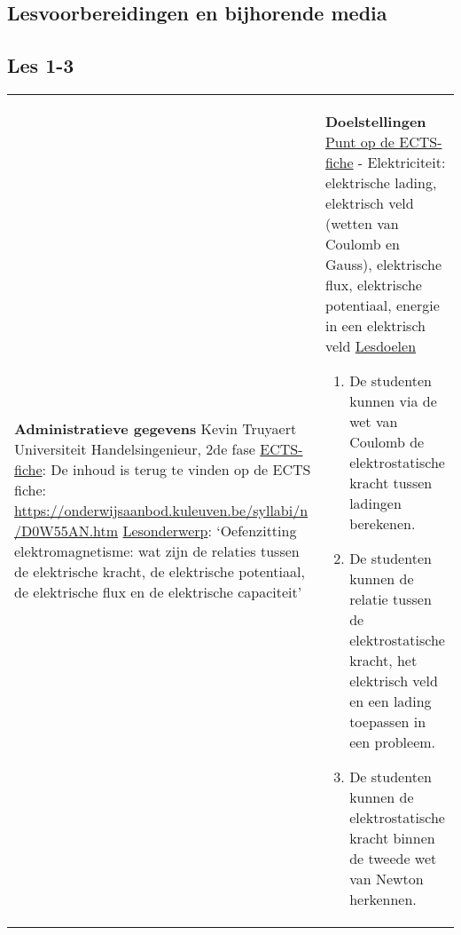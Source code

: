 


\begin{landscape}
	\section{Lesvoorbereidingen en bijhorende media}
	
	\subsection{Les 1-3}
	\begin{tabularx}{1.56\textwidth}{|p{}|X|}\hline
		\textbf{Administratieve gegevens}\newline\newline
		Kevin Truyaert\newline\newline
		Universiteit\newline
		Handelsingenieur, 2de fase\newline
		\underline{ECTS-fiche}: De inhoud is terug te vinden op de ECTS fiche: \href{https://onderwijsaanbod.kuleuven.be/syllabi/n/D0W55AN.htm}{https://onderwijsaanbod.kuleuven.be/syllabi/n /D0W55AN.htm} \newline
		\underline{Lesonderwerp}: `Oefenzitting elektromagnetisme: wat zijn de relaties tussen de elektrische kracht, de  elektrische potentiaal, de elektrische flux en de elektrische capaciteit' & \textbf{Doelstellingen}\newline\vspace{0.5cm}
		\underline{Punt op de ECTS-fiche}
		\vspace{-0.5cm}\newline  - Elektriciteit: elektrische lading, elektrisch veld (wetten van Coulomb en Gauss), elektrische flux, elektrische potentiaal, energie in een elektrisch veld \newline
		\underline{Lesdoelen}\newline
		\vspace{-0.5cm}
		\begin{enumerate}[itemsep=0.08\baselineskip]
			\item De studenten kunnen via de wet van Coulomb de elektrostatische kracht tussen ladingen berekenen.
			\item De studenten kunnen de relatie tussen de elektrostatische kracht, het elektrisch veld en een lading toepassen in een probleem.
			\item De studenten kunnen de elektrostatische kracht binnen de tweede wet van Newton herkennen.

\end{enumerate}
\end{tabularx}
\end{landscape}

